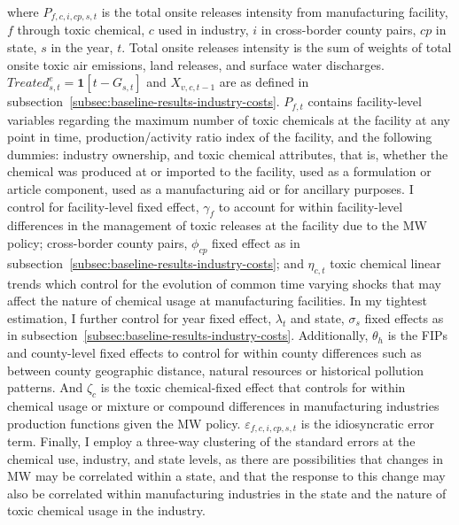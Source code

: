 \documentclass[12pt, english]{article}
\begin{document}
    where $P_{f,c,i,cp,s,t}$ is the total onsite releases intensity from manufacturing facility, $f$ through toxic chemical, $c$ used in industry, $i$ in cross-border county pairs, $cp$ in state, $s$ in the year, $t$. Total onsite releases intensity is the sum of weights of total onsite toxic air emissions, land releases, and surface water discharges. $Treated_{s,t}^e = \textbf{1}[t - G_{s,t}]$ and $X_{v,c,t-1}$ are as defined in subsection~\ref{subsec:baseline-results-industry-costs}. $P_{f,t}$ contains facility-level variables regarding the maximum number of toxic chemicals at the facility at any point in time, production/activity ratio index of the facility, and the following dummies: industry ownership, and toxic chemical attributes, that is, whether the chemical was produced at or imported to the facility, used as a formulation or article component, used as a manufacturing aid or for ancillary purposes. I control for facility-level fixed effect, $\gamma_{f}$ to account for within facility-level differences in the management of toxic releases at the facility due to the MW policy; cross-border county pairs, $\phi_{cp}$ fixed effect as in subsection~\ref{subsec:baseline-results-industry-costs}; and $\eta_{c,t}$ toxic chemical linear trends which control for the evolution of common time varying shocks that may affect the nature of chemical usage at manufacturing facilities. In my tightest estimation, I further control for year fixed effect, $\lambda_{t}$ and state, $\sigma_{s}$ fixed effects as in subsection~\ref{subsec:baseline-results-industry-costs}. Additionally,  $\theta_{h}$ is the FIPs and county-level fixed effects to control for within county differences such as between county geographic distance, natural resources or historical pollution patterns. And $\zeta_{c}$ is the toxic chemical-fixed effect that controls for within chemical usage or mixture or compound differences in manufacturing industries production functions given the MW policy. $\varepsilon_{f,c,i,cp,s,t}$ is the idiosyncratic error term. Finally, I employ a three-way clustering of the standard errors at the chemical use, industry, and state levels, as there are possibilities that changes in MW may be correlated within a state, and that the response to this change may also be correlated within manufacturing industries in the state and the nature of toxic chemical usage in the industry.
    
\end{document}
